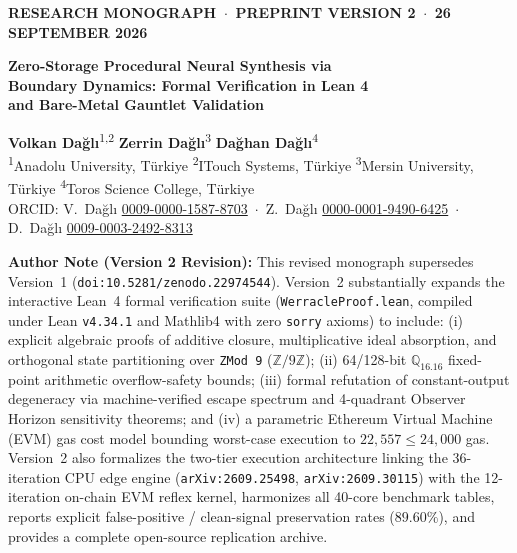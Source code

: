 \documentclass[10pt,a4paper]{article}
\begin{document}
\thispagestyle{first}

\begin{center}
{\small\bfseries\color{accentblue} RESEARCH MONOGRAPH \,$\cdot$\, PREPRINT VERSION 2 \,$\cdot$\, 26 SEPTEMBER 2026}\\[1.2ex]
{\LARGE\bfseries Zero-Storage Procedural Neural Synthesis via\\[0.3ex] Boundary Dynamics: Formal Verification in Lean 4\\[0.3ex] and Bare-Metal Gauntlet Validation\par}
\vspace{1.8ex}
{\large \textbf{Volkan Dağlı}\textsuperscript{1,2} \quad \textbf{Zerrin Dağlı}\textsuperscript{3} \quad \textbf{Dağhan Dağlı}\textsuperscript{4}}\\[1.0ex]
{\small
\textsuperscript{1}Anadolu University, Türkiye \quad
\textsuperscript{2}ITouch Systems, Türkiye \quad
\textsuperscript{3}Mersin University, Türkiye \quad
\textsuperscript{4}Toros Science College, Türkiye\\[0.8ex]
ORCID: V.~Dağlı \href{https://orcid.org/0009-0000-1587-8703}{0009-0000-1587-8703} \,$\cdot$\, Z.~Dağlı \href{https://orcid.org/0000-0001-9490-6425}{0000-0001-9490-6425} \,$\cdot$\, D.~Dağlı \href{https://orcid.org/0009-0003-2492-8313}{0009-0003-2492-8313}}
\end{center}

\vspace{0.5ex}
\noindent\colorbox{boxgray}{\parbox{\dimexpr\linewidth-2\fboxsep}{\footnotesize
\textbf{Author Note (Version 2 Revision):} This revised monograph supersedes Version~1 (\texttt{doi:10.5281/zenodo.22974544}). Version~2 substantially expands the interactive Lean~4 formal verification suite (\texttt{WerracleProof.lean}, compiled under Lean \texttt{v4.34.1} and Mathlib4 with zero \texttt{sorry} axioms) to include: (i) explicit algebraic proofs of additive closure, multiplicative ideal absorption, and orthogonal state partitioning over \texttt{ZMod 9} ($\mathbb{Z}/9\mathbb{Z}$); (ii) 64/128-bit $\mathbb{Q}_{16.16}$ fixed-point arithmetic overflow-safety bounds; (iii) formal refutation of constant-output degeneracy via machine-verified escape spectrum and 4-quadrant Observer Horizon sensitivity theorems; and (iv) a parametric Ethereum Virtual Machine (EVM) gas cost model bounding worst-case execution to $22,557 \le 24,000$ gas. Version~2 also formalizes the two-tier execution architecture linking the 36-iteration CPU edge engine (\texttt{arXiv:2609.25498}, \texttt{arXiv:2609.30115}) with the 12-iteration on-chain EVM reflex kernel, harmonizes all 40-core benchmark tables, reports explicit false-positive / clean-signal preservation rates ($89.60\%$), and provides a complete open-source replication archive.}}
\end{document}
